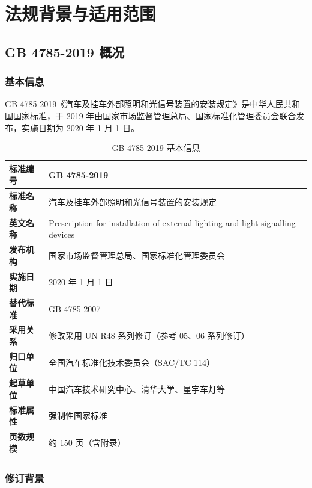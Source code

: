 \chapter{法规背景与适用范围}

\section{GB 4785-2019 概况}

\subsection{基本信息}

GB 4785-2019《汽车及挂车外部照明和光信号装置的安装规定》是中华人民共和国国家标准，于 2019 年由国家市场监督管理总局、国家标准化管理委员会联合发布，实施日期为 2020 年 1 月 1 日。

\begin{table}[H]
\centering
\caption{GB 4785-2019 基本信息}
\begin{tabularx}{\textwidth}{|l|X|}
\hline
\textbf{标准编号} & GB 4785-2019 \\
\hline
\textbf{标准名称} & 汽车及挂车外部照明和光信号装置的安装规定 \\
\hline
\textbf{英文名称} & Prescription for installation of external lighting and light-signalling devices \\
\hline
\textbf{发布机构} & 国家市场监督管理总局、国家标准化管理委员会 \\
\hline
\textbf{实施日期} & 2020 年 1 月 1 日 \\
\hline
\textbf{替代标准} & GB 4785-2007 \\
\hline
\textbf{采用关系} & 修改采用 UN R48 系列修订（参考 05、06 系列修订） \\
\hline
\textbf{归口单位} & 全国汽车标准化技术委员会（SAC/TC 114） \\
\hline
\textbf{起草单位} & 中国汽车技术研究中心、清华大学、星宇车灯等 \\
\hline
\textbf{标准属性} & 强制性国家标准 \\
\hline
\textbf{页数规模} & 约 150 页（含附录） \\
\hline
\end{tabularx}
\end{table}

\subsection{修订背景}

